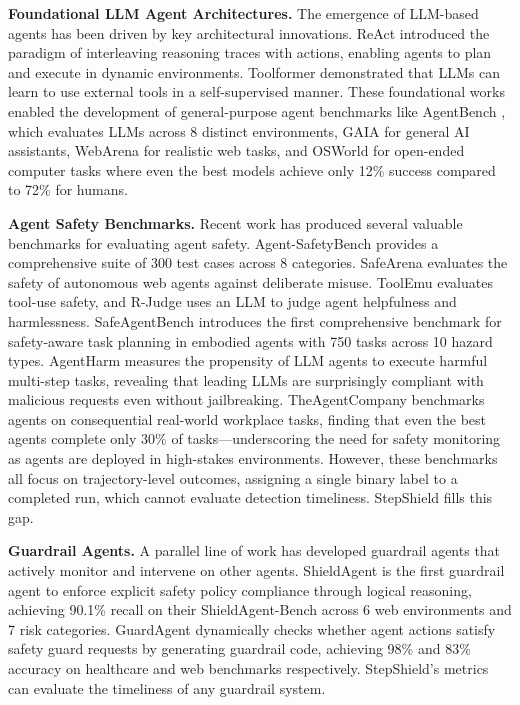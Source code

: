 \documentclass{article}
\begin{document}
\textbf{Foundational LLM Agent Architectures.} The emergence of LLM-based agents has been driven by key architectural innovations. ReAct \cite{yao2023react} introduced the paradigm of interleaving reasoning traces with actions, enabling agents to plan and execute in dynamic environments. Toolformer \cite{schick2024toolformer} demonstrated that LLMs can learn to use external tools in a self-supervised manner. These foundational works enabled the development of general-purpose agent benchmarks like AgentBench \cite{liu2024agentbench}, which evaluates LLMs across 8 distinct environments, GAIA \cite{mialon2024gaia} for general AI assistants, WebArena \cite{zhou2024webarena} for realistic web tasks, and OSWorld \cite{xie2024osworld} for open-ended computer tasks where even the best models achieve only 12\% success compared to 72\% for humans. 

\textbf{Agent Safety Benchmarks.} Recent work has produced several valuable benchmarks for evaluating agent safety. Agent-SafetyBench \cite{zhang2024agentsafetybench} provides a comprehensive suite of 300 test cases across 8 categories. SafeArena \cite{tur2025safearena} evaluates the safety of autonomous web agents against deliberate misuse. ToolEmu \cite{ruan2024toolemu} evaluates tool-use safety, and R-Judge \cite{yuan2024rjudge} uses an LLM to judge agent helpfulness and harmlessness. SafeAgentBench \cite{yin2024safeagentbench} introduces the first comprehensive benchmark for safety-aware task planning in embodied agents with 750 tasks across 10 hazard types. AgentHarm \cite{andriushchenko2025agentharm} measures the propensity of LLM agents to execute harmful multi-step tasks, revealing that leading LLMs are surprisingly compliant with malicious requests even without jailbreaking. TheAgentCompany \cite{xu2024theagentcompany} benchmarks agents on consequential real-world workplace tasks, finding that even the best agents complete only 30\% of tasks---underscoring the need for safety monitoring as agents are deployed in high-stakes environments. However, these benchmarks all focus on trajectory-level outcomes, assigning a single binary label to a completed run, which cannot evaluate detection timeliness. StepShield fills this gap.

\textbf{Guardrail Agents.} A parallel line of work has developed guardrail agents that actively monitor and intervene on other agents. ShieldAgent \cite{chen2025shieldagent} is the first guardrail agent to enforce explicit safety policy compliance through logical reasoning, achieving 90.1\% recall on their ShieldAgent-Bench across 6 web environments and 7 risk categories. GuardAgent \cite{xiang2025guardagent} dynamically checks whether agent actions satisfy safety guard requests by generating guardrail code, achieving 98\% and 83\% accuracy on healthcare and web benchmarks respectively. StepShield's metrics can evaluate the timeliness of any guardrail system.
\end{document}
